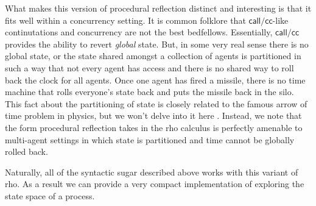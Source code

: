 

What makes this version of procedural reflection distinct and
interesting is that it fits well within a concurrency setting. It is
common folklore that $\mathsf{call/cc}$-like continutations and
concurrency are not the best bedfellows. Essentially,
$\mathsf{call/cc}$ provides the ability to revert \emph{global}
state. But, in some very real sense there is no global state, or the
state shared amongst a collection of agents is partitioned in such a
way that not every agent has access and there is no shared way to roll
back the clock for all agents. Once one agent has fired a missile,
there is no time machine that rolls everyone's state back and puts the
missile back in the silo. This fact about the partitioning of state is
closely related to the famous arrow of time problem in physics, but we
won't delve into it here \cite{enwiki:1234510214}. Instead, we note
that the form procedural reflection takes in the rho calculus is
perfectly amenable to multi-agent settings in which state is
partitioned and time cannot be globally rolled back.

Naturally, all of the syntactic sugar described above works with this
variant of rho. As a result we can provide a very compact
implementation of exploring the state space of a process.

